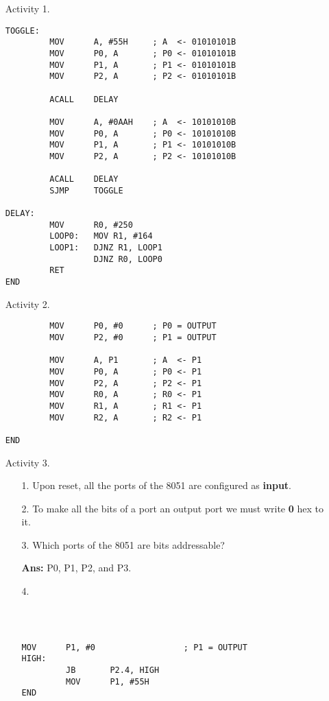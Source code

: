 \documentclass[9pt]{article}
\begin{document}
\begin{enumerate}
   \item[Activity 1.] \begin{verbatim}
TOGGLE:
         MOV      A, #55H     ; A  <- 01010101B
         MOV      P0, A       ; P0 <- 01010101B
         MOV      P1, A       ; P1 <- 01010101B
         MOV      P2, A       ; P2 <- 01010101B
         
         ACALL    DELAY
         
         MOV      A, #0AAH    ; A  <- 10101010B
         MOV      P0, A       ; P0 <- 10101010B
         MOV      P1, A       ; P1 <- 10101010B
         MOV      P2, A       ; P2 <- 10101010B
         
         ACALL    DELAY			
         SJMP     TOGGLE
			
DELAY:
         MOV      R0, #250			
         LOOP0:   MOV R1, #164		
         LOOP1:   DJNZ R1, LOOP1
                  DJNZ R0, LOOP0
         RET
END
         \end{verbatim}
   \item[Activity 2.] \begin{verbatim}
         MOV      P0, #0      ; P0 = OUTPUT
         MOV      P2, #0      ; P1 = OUTPUT

         MOV      A, P1       ; A  <- P1
         MOV      P0, A       ; P0 <- P1
         MOV      P2, A       ; P2 <- P1
         MOV      R0, A       ; R0 <- P1
         MOV      R1, A       ; R1 <- P1
         MOV      R2, A       ; R2 <- P1

END
         \end{verbatim}
   \item[Activity 3.]
      \begin{enumerate}
         \item[1.] Upon reset, all the ports of the 8051 are configured as
                   \textbf{input}.
         \item[2.] To make all the bits of a port an output port we must write
                   \textbf{0} hex to it.
         \item[3.] Which ports of the 8051 are bits addressable?
         
                   \textbf{Ans: } P0, P1, P2, and P3.
         \item[4.] \begin{verbatim}
         
         
         
MOV      P1, #0                  ; P1 = OUTPUT
HIGH:
         JB       P2.4, HIGH
         MOV      P1, #55H
END         
         \end{verbatim}
      \end{enumerate}
\end{enumerate}
\end{document}

